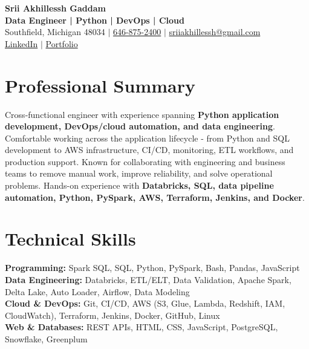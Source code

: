 \documentclass[letterpaper,10pt]{article}
\begin{document}
\fontsize{9.35pt}{10.45pt}\selectfont

\begin{center}
    {\LARGE \textbf{Srii Akhillessh Gaddam}} \\[-1pt]
    \textbf{Data Engineer | Python | DevOps | Cloud} \\[2pt]
    Southfield, Michigan 48034 $|$
    \href{tel:6468752400}{646-875-2400} $|$
    \href{mailto:sriiakhillessh@gmail.com}{sriiakhillessh@gmail.com} \\[1pt]
    \href{https://www.linkedin.com/in/srii-akhiilessh-gaddam-b48668191/}{LinkedIn} $|$
    \href{https://sriiakhillesshg.github.io/portfolio/}{Portfolio}
\end{center}
\vspace{-8pt}

\section{Professional Summary}
\small{Cross-functional engineer with experience spanning \textbf{Python application development, DevOps/cloud automation, and data engineering}. Comfortable working across the application lifecycle - from Python and SQL development to AWS infrastructure, CI/CD, monitoring, ETL workflows, and production support. Known for collaborating with engineering and business teams to remove manual work, improve reliability, and solve operational problems. Hands-on experience with \textbf{Databricks, SQL, data pipeline automation, Python, PySpark, AWS, Terraform, Jenkins, and Docker}.}

\section{Technical Skills}
\small{
\textbf{Programming:} Spark SQL, SQL, Python, PySpark, Bash, Pandas, JavaScript \\
\textbf{Data Engineering:} Databricks, ETL/ELT, Data Validation, Apache Spark, Delta Lake, Auto Loader, Airflow, Data Modeling \\
\textbf{Cloud \& DevOps:} Git, CI/CD, AWS (S3, Glue, Lambda, Redshift, IAM, CloudWatch), Terraform, Jenkins, Docker, GitHub, Linux \\
\textbf{Web \& Databases:} REST APIs, HTML, CSS, JavaScript, PostgreSQL, Snowflake, Greenplum
}

\end{document}
